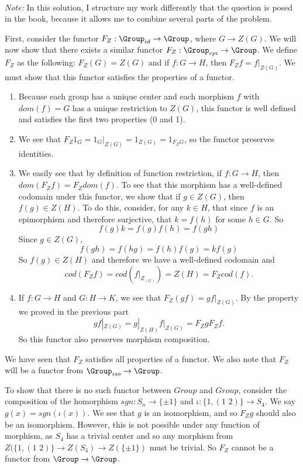 \documentclass[main.tex]{subfiles}
\begin{document}
\paragraph{}
\textit{Note:} In this solution, I structure my work differently that the
question is posed in the book, because it allows me to combine several parts of
the problem.

First, consider the functor $F_Z: \Group_{id}\rightarrow \Group$, where $G
\rightarrow Z(G)$. We will now show that there exists a similar functor $F_Z:
\Group_{epi} \rightarrow \Group$. We define $F_Z$ as the following: $F_Z(G) =
Z(G)$ and if $f: G \rightarrow H$, then $F_{Z} f = f|_{Z(G)}$. We must show that
this functor satisfies the properties of a functor.
\begin{enumerate}
	\item Because each group has a unique center and each morphism $f$ with
		$dom(f) = G$ has a unique restriction to $Z(G)$, this functor is well
		defined and satisfies the first two properties (0 and 1).

	\item We see that $F_{Z} 1_{G} = 1_{G}|_{Z(G)} = 1_{Z(G)} = 1_{F_{Z}G}$, so
		the functor preserves identities.

	\item We easily see that by definition of function restriction, if $f: G
		\rightarrow H$, then $dom(F_{Z}f) = F_{Z}dom(f)$. To see that this
		morphism has a well-defined codomain under this functor, we show that if
		$g \in Z(G)$, then $f(g) \in Z(H)$. To do this, consider, for any $k \in
		H$, that since $f$ is an epimorphism and therefore surjective, that $k =
		f(h)$ for some $h \in G$. So \[f(g)k = f(g)f(h) = f(gh)\]Since $g \in
		Z(G)$, \[f(gh) = f(hg) = f(h)f(g) = kf(g)\] So $f(g) \in Z(H)$ and
		therefore we have a well-defined codomain and  \[cod(F_{Z}f) =
		cod(f|_{Z_(G)}) = Z(H) = F_{Z}cod(f).\]

	\item If $f:G \rightarrow H$ and $G: H \rightarrow K$, we see that $F_Z(gf)
		= gf|_{Z(G)}$. By the property we proved in the previous part
		\[gf|_{Z(G)} = g|_{Z(H)}f|_{Z(G)} = F_ZgF_Zf.\] So this functor also
		preserves morphism composition.
\end{enumerate}

We have seen that $F_Z$ satisfies all properties of a functor. We also note that
$F_Z$ will be a functor from $\Group_{iso} \rightarrow \Group$.

To show that there is no such functor between $Group$ and $Group$, consider the
composition of the homorphism $sgn: S_n \rightarrow \{ \pm 1 \} $ and $\iota:
\{1, (1 \,\, 2) \} \rightarrow S_4$. We say $ g(x) = sgn(\iota(x))$. We see that
$g$ is an isomorphism, and so $F_Zg$ should also be an isomorphism. However,
this is not possible under any function of morphism, as $S_4$ has a trivial
center and so any morphism from $Z(\{1, (1\,\,2)\} \rightarrow Z(S_4)
\rightarrow Z(\{\pm 1\})$ must be trivial. So $F_Z$ cannot be a functor from
$\Group \rightarrow \Group$.
\end{document}

